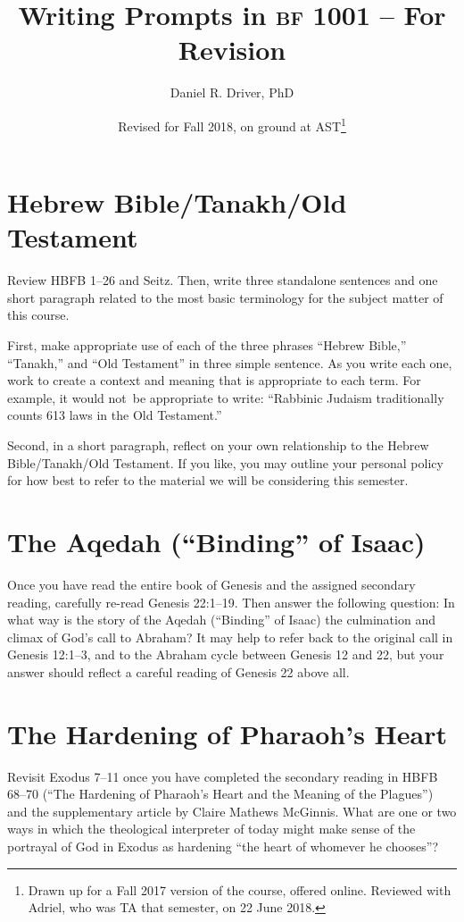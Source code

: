\documentclass[12pt]{article}
\title{Writing Prompts in \textsc{bf} 1001 – For Revision}
\author{Daniel R. Driver, PhD}
\date{Revised for Fall 2018, on ground at AST\thanks{Drawn up for a Fall 2017 version of the course, offered online. Reviewed with Adriel, who was TA that semester, on 22 June 2018.}}
\begin{document}
\maketitle

\section{Hebrew Bible/Tanakh/Old Testament}

Review HBFB 1–26 and Seitz. Then, write three standalone sentences and one short paragraph related to the most basic terminology for the subject matter of this course.

First, make appropriate use of each of the three phrases “Hebrew Bible,” “Tanakh,” and “Old Testament” in three simple sentence. As you write each one, work to create a context and meaning that is appropriate to each term. For example, it would not be appropriate to write: “Rabbinic Judaism traditionally counts 613 laws in the Old Testament.”

Second, in a short paragraph, reflect on your own relationship to the Hebrew Bible/Tanakh/Old Testament. If you like, you may outline your personal policy for how best to refer to the material we will be considering this semester.

\section{The Aqedah (“Binding” of Isaac)}

Once you have read the entire book of Genesis and the assigned secondary reading, carefully re-read Genesis 22:1–19. Then answer the following question: In what way is the story of the Aqedah (“Binding” of Isaac) the culmination and climax of God’s call to Abraham? It may help to refer back to the original call in Genesis 12:1–3, and to the Abraham cycle between Genesis 12 and 22, but your answer should reflect a careful reading of Genesis 22 above all.


\section{The Hardening of Pharaoh's Heart}

Revisit Exodus 7–11 once you have completed the secondary reading in HBFB 68–70 (“The Hardening of Pharaoh’s Heart and the Meaning of the Plagues”) and the supplementary article by Claire Mathews McGinnis. What are one or two ways in which the theological interpreter of today might make sense of the portrayal of God in Exodus as hardening “the heart of whomever he chooses”?
\end{document}
